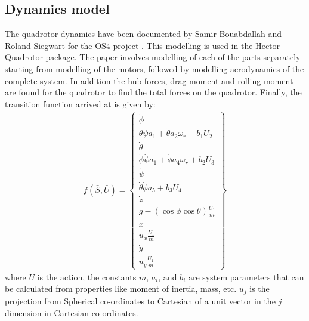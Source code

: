 \documentclass[hidelinks,BTech]{iitmdiss}
\begin{document}
\subsection*{Dynamics model}
The quadrotor dynamics have been documented by Samir Bouabdallah and Roland Siegwart for the OS4 project \cite{QuadrotorDynamics}. This modelling is used in the Hector Quadrotor package. The paper involves modelling of each of the parts separately starting from modelling of the motors, followed by modelling aerodynamics of the complete system. In addition the hub forces, drag moment and rolling moment are found for the quadrotor to find the total forces on the quadrotor. Finally, the transition function arrived at is given by:
\begin{equation} \begin{split}
  f(\bar{S}, \bar{U}) = \left\{
    \begin{array}{c}
      \dot{\phi} \\
      \dot{\theta} \dot{\psi} a_{1} + \dot{\theta} a_{2} \omega_{r} + b_{1} U_{2} \\
      \dot{\theta} \\
      \dot{\phi} \dot{\psi} a_{1} + \dot{\phi} a_{4} \omega_{r} + b_{2} U_{3} \\
      \dot{\psi} \\
      \dot{\theta} \dot{\phi} a_{5} + b_{3} U_{4} \\
      \dot{z} \\
      g  - (\cos{\phi} \cos{\theta})\frac{U_{1}}{m} \\
      \dot{x} \\
      u_{x} \frac{U_{1}}{m} \\
      \dot{y} \\
      u_{y} \frac{U_{1}}{m}
    \end{array}
  \right\}
\end{split} \end{equation}
where $\bar{U}$ is the action, the constants $m$, $a_{i}$, and $b_{i}$ are system parameters that can be calculated from properties like moment of inertia, mass, etc. $u_{j}$ is the projection from Spherical co-ordinates to Cartesian of a unit vector in the $j$ dimension in Cartesian co-ordinates.
\end{document}
